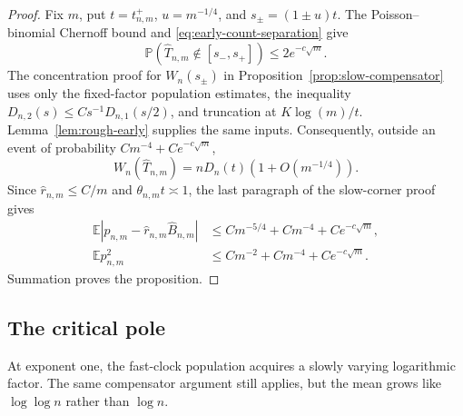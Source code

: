 \documentclass[11pt]{article}
\theoremstyle{remark}
\theoremstyle{plain}
\newcommand{\E}{\mathbb E}
\newcommand{\Pp}{\mathbb P}
\begin{document}
\begin{proof}
Fix $m$, put $t=t_{n,m}^+$, $u=m^{-1/4}$, and
$s_\pm=(1\pm u)t$.  The Poisson--binomial Chernoff bound and
\eqref{eq:early-count-separation} give
\[
 \Pp(\widehat T_{n,m}\notin[s_-,s_+])\le2e^{-c\sqrt m}.
\]
The concentration proof for $W_n(s_\pm)$ in
Proposition~\ref{prop:slow-compensator} uses only the fixed-factor
population estimates, the inequality
$D_{n,2}(s)\le Cs^{-1}D_{n,1}(s/2)$, and truncation at
$K\log(m)/t$.  Lemma~\ref{lem:rough-early} supplies the same inputs.
Consequently, outside an event of probability
$Cm^{-4}+Ce^{-c\sqrt m}$,
\[
 W_n(\widehat T_{n,m})=nD_n(t)(1+O(m^{-1/4})).
\]
Since $\widehat r_{n,m}\le C/m$ and
$\theta_{n,m}t\asymp1$, the last paragraph of the slow-corner proof gives
\begin{align*}
 \E|p_{n,m}-\widehat r_{n,m}\widehat B_{n,m}|
 &\le Cm^{-5/4}+Cm^{-4}+Ce^{-c\sqrt m},\\
 \E p_{n,m}^2&\le Cm^{-2}+Cm^{-4}+Ce^{-c\sqrt m}.
\end{align*}
Summation proves the proposition.
\end{proof}

\subsection{The critical pole}

At exponent one, the fast-clock population acquires a slowly varying
logarithmic factor.  The same compensator argument still applies, but the
mean grows like $\log\log n$ rather than $\log n$.
\end{document}
